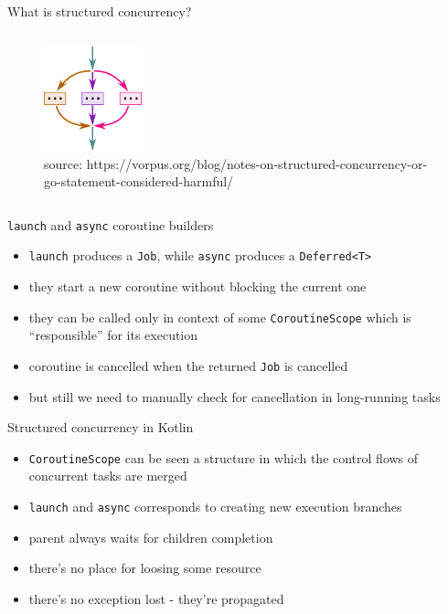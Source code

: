 \documentclass[hyperref={pdfpagelabels=false},xcolor={dvipsnames},compress,onlytextwidth]{beamer}
\newcommand{\source}[1]{\caption*{\tiny source: {#1}} }
\begin{document}
\begin{frame}[fragile]{What is structured concurrency?}
\begin{columns}
\begin{column}{0.28\textwidth}
{\begin{figure}
                        \centering
                        \includegraphics[width=80pt]{images/structured-concurrency}
                        \source{https://vorpus.org/blog/notes-on-structured-concurrency-or-go-statement-considered-harmful/}
                    \end{figure}
                }
            \end{column}
        \end{columns}
    \end{frame}

    \begin{frame}[fragile]{\texttt{launch} and \texttt{async} coroutine builders}
        \begin{itemize}
            \item \texttt{launch} produces a \texttt{Job}, while \texttt{async} produces a \texttt{Deferred<T>}\pause
            \item they start a new coroutine without blocking the current one\pause
            \item they can be called only in context of some \texttt{CoroutineScope} which is ``responsible'' for its execution\pause
            \item coroutine is cancelled when the returned \texttt{Job} is cancelled\pause
            \item but still we need to manually check for cancellation in long-running tasks
        \end{itemize}
    \end{frame}

    \begin{frame}[fragile]{Structured concurrency in Kotlin}
        \begin{itemize}
            \item \texttt{CoroutineScope} can be seen a structure in which the control flows of concurrent tasks are merged\pause
            \item \texttt{launch} and \texttt{async} corresponds to creating new execution branches\pause
            \item parent always waits for children completion\pause
            \item there's no place for loosing some resource\pause
            \item there's no exception lost - they're propagated
        \end{itemize}
    \end{frame}
\end{document}
